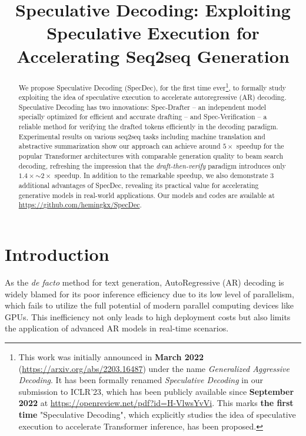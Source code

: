 \title{Speculative Decoding: Exploiting Speculative Execution for Accelerating Seq2seq Generation}

\begin{abstract}
We propose Speculative Decoding (SpecDec), for the first time ever\footnote{This work was initially announced in \textbf{March 2022} (\url{https://arxiv.org/abs/2203.16487}) under the name \textit{Generalized Aggressive Decoding}. It has been formally renamed \textit{Speculative Decoding} in our submission to ICLR'23, which has been publicly available since \textbf{September 2022} at \url{https://openreview.net/pdf?id=H-VlwsYvVi}. This marks \textbf{the first time} "Speculative Decoding", which explicitly studies the idea of speculative execution to accelerate Transformer inference, has been proposed.}, to formally study exploiting the idea of speculative execution to accelerate autoregressive (AR) decoding. Speculative Decoding has two innovations: Spec-Drafter -- an independent model specially optimized for efficient and accurate drafting -- and Spec-Verification -- a reliable method for verifying the drafted tokens efficiently in the decoding paradigm. Experimental results on various seq2seq tasks including machine translation and abstractive summarization show our approach can achieve around $5\times$ speedup for the popular Transformer architectures with comparable generation quality to beam search decoding, refreshing the impression that the \textit{\textit{draft-then-verify}} paradigm introduces only $1.4\times$$\sim$$2\times$ speedup. In addition to the remarkable speedup, we also demonstrate 3 additional advantages of SpecDec, revealing its practical value for accelerating generative models in real-world applications. Our models and codes are available at \url{https://github.com/hemingkx/SpecDec}.
\end{abstract}

\section{Introduction}\label{sec:intro}
As the \textit{de facto} method for text generation, AutoRegressive (AR) decoding is widely blamed for its poor inference efficiency due to its low level of parallelism, which fails to utilize the full potential of modern parallel computing devices like GPUs. This inefficiency not only leads to high deployment costs but also limits the application of advanced AR models in real-time scenarios.

